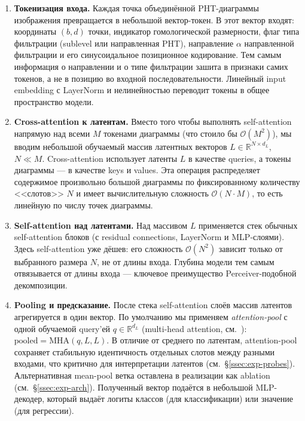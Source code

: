 \begin{enumerate}
\item \textbf{Токенизация входа.} Каждая точка объединённой PHT-диаграммы изображения превращается в небольшой вектор-токен. В этот вектор входят: координаты $(b, d)$ точки, индикатор гомологической размерности, флаг типа фильтрации (sublevel или направленная PHT), направление $\alpha$ направленной фильтрации и его синусоидальное позиционное кодирование. Тем самым информация о направлении и о типе фильтрации зашита в признаки самих токенов, а не в позицию во входной последовательности. Линейный input embedding с LayerNorm и нелинейностью переводит токены в общее пространство модели.

\item \textbf{Cross-attention к латентам.} Вместо того чтобы выполнять self-attention напрямую над всеми $M$ токенами диаграммы (что стоило бы $\mathcal{O}(M^2)$), мы вводим небольшой обучаемый массив латентных векторов $L \in \mathbb{R}^{N \times d_L}$, $N \ll M$. Cross-attention использует латенты $L$ в качестве queries, а токены диаграммы --- в качестве keys и values. Эта операция распределяет содержимое произвольно большой диаграммы по фиксированному количеству <<слотов>> $N$ и имеет вычислительную сложность $\mathcal{O}(N \cdot M)$, то есть линейную по числу точек диаграммы.

\item \textbf{Self-attention над латентами.} Над массивом $L$ применяется стек обычных self-attention блоков (с residual connections, LayerNorm и MLP-слоями). Здесь self-attention уже дёшев: его сложность $\mathcal{O}(N^2)$ зависит только от выбранного размера $N$, не от длины входа. Глубина модели тем самым отвязывается от длины входа --- ключевое преимущество Perceiver-подобной декомпозиции.

\item \textbf{Pooling и предсказание.} После стека self-attention слоёв массив латентов агрегируется в один вектор. По умолчанию мы применяем \emph{attention-pool} с одной обучаемой query'ей $q \in \mathbb{R}^{d_L}$ (multi-head attention, см.~\cite{leeSetTransformer2019}): $\text{pooled} = \mathrm{MHA}(q, L, L)$. В отличие от среднего по латентам, attention-pool сохраняет стабильную идентичность отдельных слотов между разными входами, что критично для интерпретации латентов (см.~§\ref{ssec:exp-probes}). Альтернативная mean-pool ветка оставлена в реализации как ablation (см.~§\ref{ssec:exp-arch}). Полученный вектор подаётся в небольшой MLP-декодер, который выдаёт логиты классов (для классификации) или значение (для регрессии).
\end{enumerate}

